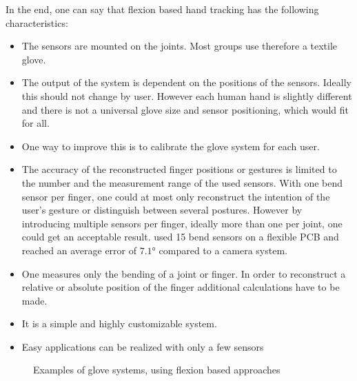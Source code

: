 In the end, one can say that flexion based hand tracking has the following characteristics:\\
\begin{itemize}
\item The sensors are mounted on the joints. Most groups use therefore a textile glove. 
\item The output of the system is dependent on the positions of the sensors. Ideally this should not change by user. However each human hand is slightly different and there is not a universal glove size and sensor positioning, which would fit for all.
\item One way to improve this is to calibrate the glove system for each user.
\item The accuracy of the reconstructed finger positions or gestures is limited to the number and the measurement range of the used sensors. With one bend sensor per finger, one could at most only reconstruct the intention of the user's gesture or distinguish between several postures. However by introducing multiple sensors per finger, ideally more than one per joint, one could get an acceptable result. \cite{zecca2007development} used 15 bend sensors on a flexible PCB and reached an average error of $ \ang{7.1} $  compared to a camera system.
\item One measures only the bending of a joint or finger. In order to reconstruct a relative or absolute position of the finger additional calculations have to be made.
\item It is a simple and highly customizable system.
\item Easy applications can be realized with only a few sensors
\end{itemize}

\begin{figure}[h]
	\hfill
	\hfill
	
	\caption[Flexion based glove systems]{Examples of glove systems, using flexion based approaches}
	\label{fig:examplesFlexion}
\end{figure}


